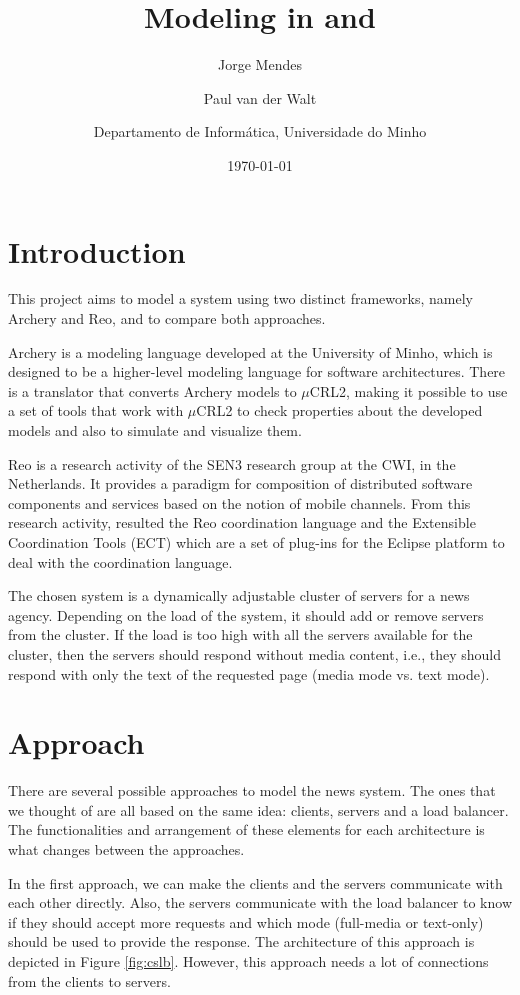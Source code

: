 \documentclass[a4paper]{article}
\author{Jorge Mendes \and Paul van der Walt \and \small{Departamento de Inform\'atica, Universidade do Minho}}
\date{\today}
\title{Modeling in \ar and \re}
\newcommand{\ar}{Archery\xspace}
\newcommand{\re}{Reo\xspace}
\newcommand{\mcrl}{$\mu$CRL2\xspace}
\begin{document}
\maketitle

%
%
\section{Introduction}

This project aims to model a system using two distinct frameworks, namely \ar
and \re, and to compare both approaches.

\ar is a modeling language developed at the University of Minho, which is designed
to be a higher-level modeling language for software architectures. There is a translator
that converts \ar models to \mcrl, making it possible to use a set of tools that work with
\mcrl to check properties about the developed models and also to simulate and visualize them.

\re is a research activity of the SEN3 research group at the CWI, in the
Netherlands. It provides a paradigm for composition of distributed software
components and services based on the notion of mobile channels.
From this research activity, resulted the \re coordination language and the
Extensible Coordination Tools (ECT) which are a set of plug-ins for the Eclipse
platform to deal with the coordination language.

The chosen system is a dynamically adjustable cluster of servers for a news
agency. Depending on the load of the system, it should add or remove servers
from the cluster. If the load is too high with all the servers available for
the cluster, then the servers should respond without media content, i.e., they
should respond with only the text of the requested page (media mode vs. text
mode).



%
%
\section{Approach}

There are several possible approaches to model the news system. The ones that we
thought of are all based on the same idea: clients, servers and a load balancer. The
functionalities and arrangement of these elements for each architecture is what
changes between the approaches.

In the first approach, we can make the clients and the servers communicate with
each other
directly. Also, the servers communicate with the load balancer to
know if they should accept more requests and which mode (full-media or
text-only) should be used to provide the response. The architecture of this
approach is depicted in Figure \ref{fig:cslb}. However, this approach needs
a lot of connections from the clients to servers.
\end{document}
